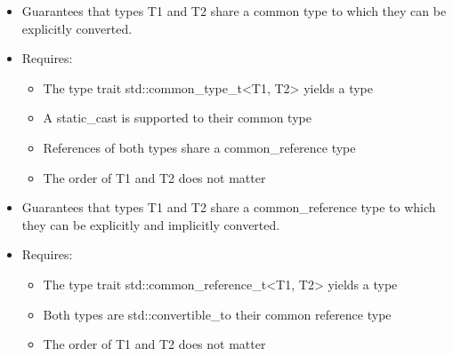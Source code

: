 
\begin{itemize}
\item
Guarantees that types T1 and T2 share a common type to which they can be explicitly converted.

\item
Requires:
\begin{itemize}
\item
The type trait std::common\_type\_t<T1, T2> yields a type

\item
A static\_cast is supported to their common type

\item
References of both types share a common\_reference type

\item
The order of T1 and T2 does not matter
\end{itemize}
\end{itemize}


\begin{itemize}
\item
Guarantees that types T1 and T2 share a common\_reference type to which they can be explicitly and implicitly converted.

\item
Requires:
\begin{itemize}
\item
The type trait std::common\_reference\_t<T1, T2> yields a type

\item
Both types are std::convertible\_to their common reference type

\item
The order of T1 and T2 does not matter
\end{itemize}
\end{itemize}



